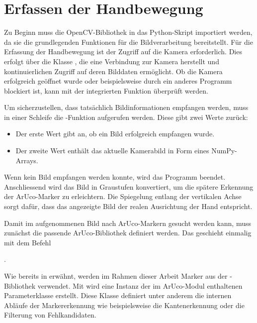 \section{Erfassen der Handbewegung}

Zu Beginn muss die OpenCV-Bibliothek in das Python-Skript importiert werden, da sie die grundlegenden Funktionen für die Bildverarbeitung bereitstellt.
Für die Erfassung der Handbewegung ist der Zugriff auf die Kamera erforderlich.
Dies erfolgt über die Klasse , die eine Verbindung zur Kamera herstellt und kontinuierlichen Zugriff auf deren Bilddaten ermöglicht.
Ob die Kamera erfolgreich geöffnet wurde oder beispielsweise durch ein anderes Programm blockiert ist, kann mit der integrierten Funktion  überprüft werden.

Um sicherzustellen, dass tatsächlich Bildinformationen empfangen werden, muss in einer Schleife die -Funktion aufgerufen werden.
Diese gibt zwei Werte zurück:

\begin{itemize}
    \item Der erste Wert gibt an, ob ein Bild erfolgreich empfangen wurde\footnotemark{}.
    \item Der zweite Wert enthält das aktuelle Kamerabild in Form eines NumPy-Arrays\footnotemark{}.
\end{itemize}

Wenn kein Bild empfangen werden konnte, wird das Programm beendet.
Anschliessend wird das Bild in Graustufen konvertiert, um die spätere Erkennung der ArUco-Marker zu erleichtern.
Die Spiegelung entlang der vertikalen Achse sorgt dafür, dass das angezeigte Bild der realen Ausrichtung der Hand entspricht.

Damit im aufgenommenen Bild nach ArUco-Markern gesucht werden kann, muss zunächst die passende ArUco-Bibliothek definiert werden.
Das geschieht einmalig mit dem Befehl

.

Wie bereits in  erwähnt, werden im Rahmen dieser Arbeit Marker aus der -Bibliothek verwendet.
Mit  wird eine Instanz der im ArUco-Modul enthaltenen Parameterklasse erstellt.
Diese Klasse definiert unter anderem die internen Abläufe der Markererkennung wie beispielsweise die Kantenerkennung oder die Filterung von Fehlkandidaten.

